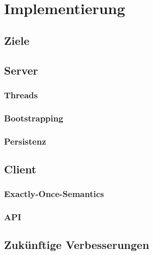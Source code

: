 \chapter{Implementierung}
\label{impl}

\section{Ziele}

\section{Server}

\subsection{Threads}

\subsection{Bootstrapping}

\subsection{Persistenz}

\section{Client}

\subsection{Exactly-Once-Semantics}

\subsection{API}

\section{Zukünftige Verbesserungen}